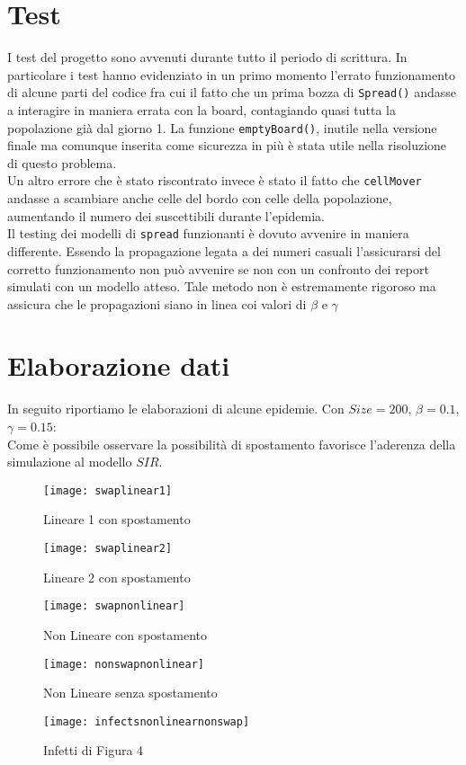 \documentclass[a4paper]{article}
\begin{document}
\section{Test}
I test del progetto sono avvenuti durante tutto il periodo di scrittura. In particolare i test hanno evidenziato in un primo momento l'errato funzionamento di alcune parti del codice fra cui il fatto che un prima bozza di \texttt{Spread()} andasse a interagire in maniera errata con la board, contagiando quasi tutta la popolazione già dal giorno 1. La funzione \texttt{emptyBoard()}, inutile nella versione finale ma comunque inserita come sicurezza in più è stata utile nella risoluzione di questo problema.\\
 Un altro errore che è stato riscontrato invece è stato il fatto che \texttt{cellMover} andasse a scambiare anche celle del bordo con celle della popolazione, aumentando il numero dei suscettibili durante l'epidemia.\\
 Il testing dei modelli di \texttt{spread} funzionanti è dovuto avvenire in maniera differente. Essendo la propagazione legata a dei numeri casuali l'assicurarsi del corretto funzionamento non può avvenire se non con un confronto dei report simulati con un modello atteso. Tale metodo non è estremamente rigoroso ma assicura che le propagazioni siano in linea coi valori di $\beta$ e $\gamma$
 
\section{Elaborazione dati}
 In seguito riportiamo le elaborazioni di alcune epidemie. Con $Size = 200$, $\beta = 0.1$, $\gamma = 0.15$:\\
 Come è possibile osservare la possibilità di spostamento favorisce l'aderenza della simulazione al modello $SIR$.\\
\begin{figure}[!h]
	\centering
	\texttt{[image: swaplinear1]}
	\caption[Lineare 1 con spostamento]{Lineare 1 con spostamento}
	\label{fig:swaplinear1}
\end{figure}
\begin{figure}
	\centering
	\texttt{[image: swaplinear2]}
	\caption[Lineare 2 con spostamento]{Lineare 2 con spostamento}
	\label{fig:swaplinear1}
\end{figure}
\begin{figure}
	\centering
	\texttt{[image: swapnonlinear]}
	\caption[nonLineare  con spostamento]{Non Lineare con spostamento}
	\label{fig:swaplinear1}
\end{figure}
\begin{figure}
	\centering
	\texttt{[image: nonswapnonlinear]}
	\caption[nonLineare noSpostamento]{Non Lineare senza spostamento}
	\label{fig:swaplinear1}
\end{figure}
\begin{figure}
	\centering
	\texttt{[image: infectsnonlinearnonswap]}
	\caption[Infetti nonLineare noSpostamento]{Infetti di Figura 4}
	\label{fig:swaplinear1}
\end{figure}
\end{document}
